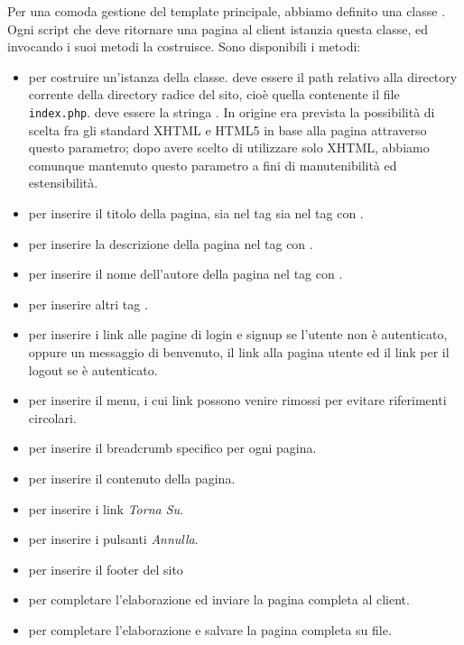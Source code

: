 Per una comoda gestione del template principale, abbiamo definito una classe .
Ogni script che deve ritornare una pagina al client istanzia questa classe, ed invocando i suoi metodi la costruisce.
Sono disponibili i metodi:
\begin{itemize}
	\item {} per costruire un'istanza della classe.  deve essere il path relativo alla directory corrente della directory radice del sito, cioè quella contenente il file \texttt{index.php}.  deve essere la stringa . In origine era prevista la possibilità di scelta fra gli standard XHTML e HTML5 in base alla pagina attraverso questo parametro; dopo avere scelto di utilizzare solo XHTML, abbiamo comunque mantenuto questo parametro a fini di  manutenibilità ed estensibilità.
	\item {} per inserire il titolo della pagina, sia nel tag  sia nel tag  con .
	\item {} per inserire la descrizione della pagina nel tag  con .
	\item {} per inserire il nome dell'autore della pagina nel tag  con .
	\item {} per inserire altri tag .
	\item {} per inserire i link alle pagine di login e signup se l'utente non è autenticato, oppure un messaggio di benvenuto, il link alla pagina utente ed il link per il logout se è autenticato.
	\item {} per inserire il menu, i cui link possono venire rimossi per evitare riferimenti circolari.
	\item {} per inserire il breadcrumb specifico per ogni pagina.
	\item {} per inserire il contenuto della pagina.
	\item {} per inserire i link \textit{Torna Su}.
	\item {} per inserire i pulsanti \textit{Annulla}.
	\item {} per inserire il footer del sito
	\item {} per completare l'elaborazione ed inviare la pagina completa al client.
	\item {} per completare l'elaborazione e salvare la pagina completa su file.
\end{itemize}


